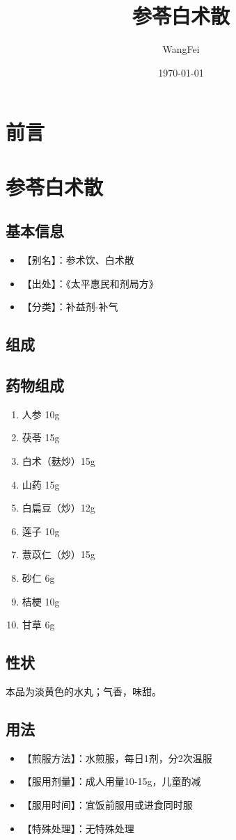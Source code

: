 \documentclass[12pt,UTF8]{ctexbook}
\title{\heiti\zihao{0} 参苓白术散}
\author{WangFei}
\date{\today}
\newenvironment{fangji}[1]{\section{#1}\begin{enumerate}[leftmargin=2cm]}{\end{enumerate}}
\begin{document}
\maketitle
\tableofcontents

\frontmatter
\chapter{前言}

\mainmatter

\chapter{参苓白术散}

\section{基本信息}
\begin{itemize}
	\item 【别名】：参术饮、白术散
	\item 【出处】：《太平惠民和剂局方》
	\item 【分类】：补益剂-补气
\end{itemize}

\section{组成}
\begin{fangji}{药物组成}
	\item 人参 10g
	\item 茯苓 15g
	\item 白术（麸炒）15g
	\item 山药 15g
	\item 白扁豆（炒）12g
	\item 莲子 10g
	\item 薏苡仁（炒）15g
	\item 砂仁 6g
	\item 桔梗 10g
	\item 甘草 6g
\end{fangji}

\section{性状}
本品为淡黄色的水丸；气香，味甜。

\section{用法}
\begin{itemize}
	\item 【煎服方法】：水煎服，每日1剂，分2次温服
	\item 【服用剂量】：成人用量10-15g，儿童酌减
	\item 【服用时间】：宜饭前服用或进食同时服
	\item 【特殊处理】：无特殊处理
\end{itemize}
\end{document}
